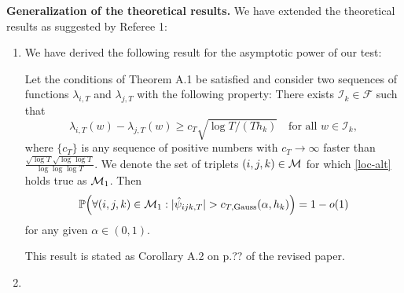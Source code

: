 \documentclass[a4paper,12pt]{article}
\begin{document}
\textbf{Generalization of the theoretical results.} We have extended the theoretical results as suggested by Referee 1:
\begin{enumerate}[label=(\roman*), leftmargin=0.8cm]

\item We have derived the following result for the asymptotic power of our test:

Let the conditions of Theorem A.1 be satisfied and consider two sequences of functions $\lambda_{i, T}$ and $\lambda_{j, T}$ with the following property: There exists $\mathcal{I}_{k} \in \mathcal{F}$ such that 
\begin{equation}\label{loc-alt}
\lambda_{i, T}(w) - \lambda_{j, T}(w) \ge c_T \sqrt{\log T / (T h_{k})} \quad \text{for all } w \in \mathcal{I}_{k}, 
\end{equation}
where $\{c_T\}$ is any sequence of positive numbers with $c_T \rightarrow \infty$ faster than \linebreak $\frac{\sqrt{\log T}\sqrt{\log \log T}}{\log \log \log T}$. We denote the set of triplets $(i, j, k) \in \mathcal{M}$ for which \eqref{loc-alt} holds true as $\mathcal{M}_1$. Then 
\[ \mathbb{P}\Big( \forall (i,j,k) \in \mathcal{M}_1: |\hat{\psi}_{ijk,T}| > c_{T,\textnormal{Gauss}}(\alpha,h_k) \Big) = 1 - o(1) \]
for any given $\alpha \in (0, 1)$. 


This result is stated as Corollary A.2 on p.??  of the revised paper. 


\item %
\end{enumerate}
\vspace{3pt}
\end{document}
